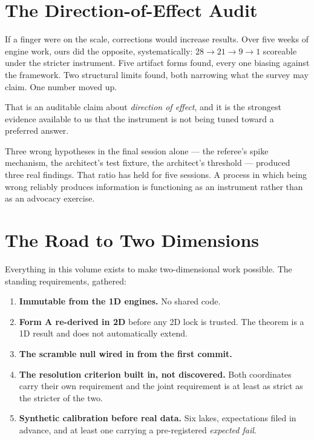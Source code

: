 \documentclass[11pt, letterpaper, openany]{book}
\begin{document}
\section{The Direction-of-Effect Audit}

If a finger were on the scale, corrections would increase results. Over five weeks of engine
work, ours did the opposite, systematically: $28 \to 21 \to 9 \to 1$ scoreable under the
stricter instrument. Five artifact forms found, every one biasing against the framework. Two
structural limits found, both narrowing what the survey may claim. One number moved up.

\begin{signalbox}
That is an auditable claim about \emph{direction of effect}, and it is the strongest evidence
available to us that the instrument is not being tuned toward a preferred answer.

\medskip
\noindent Three wrong hypotheses in the final session alone --- the referee's spike mechanism,
the architect's test fixture, the architect's threshold --- produced three real findings. That
ratio has held for five sessions. A process in which being wrong reliably produces information
is functioning as an instrument rather than as an advocacy exercise.
\end{signalbox}

\section{The Road to Two Dimensions}

Everything in this volume exists to make two-dimensional work possible. The standing
requirements, gathered:

\begin{enumerate}
    \item \textbf{Immutable from the 1D engines.} No shared code.
    \item \textbf{Form A re-derived in 2D} before any 2D lock is trusted. The theorem is a 1D
          result and does not automatically extend.
    \item \textbf{The scramble null wired in from the first commit.}
    \item \textbf{The resolution criterion built in, not discovered.} Both coordinates carry
          their own requirement and the joint requirement is at least as strict as the stricter
          of the two.
    \item \textbf{Synthetic calibration before real data.} Six lakes, expectations filed in
          advance, and at least one carrying a pre-registered \emph{expected fail}.
\end{enumerate}
\end{document}
